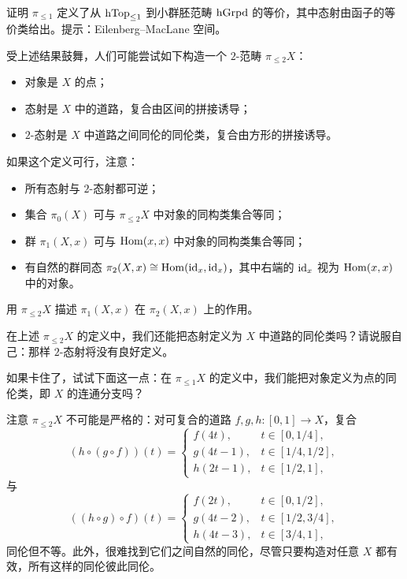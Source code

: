 \begin{exercise}\label{L1-4.12}
证明 $\pi_{\le 1}$ 定义了从 $\operatorname{hTop}_{\le 1}$ 到小群胚范畴 $\operatorname{hGrpd}$ 的等价，其中态射由函子的等价类给出。提示：Eilenberg--MacLane 空间。
\end{exercise}

\nitem\label{L1-4.13} 受上述结果鼓舞，人们可能尝试如下构造一个 $2$-范畴 $\pi_{\le 2}X$：
\begin{itemize}[leftmargin=2.2em,itemsep=0.1em]
\item 对象是 $X$ 的点；
\item 态射是 $X$ 中的道路，复合由区间的拼接诱导；
\item $2$-态射是 $X$ 中道路之间同伦的同伦类，复合由方形的拼接诱导。
\end{itemize}
如果这个定义可行，注意：
\begin{itemize}[leftmargin=2.2em,itemsep=0.1em]
\item 所有态射与 $2$-态射都可逆；
\item 集合 $\pi_0(X)$ 可与 $\pi_{\le 2}X$ 中对象的同构类集合等同；
\item 群 $\pi_1(X,x)$ 可与 $\operatorname{Hom}(x,x)$ 中对象的同构类集合等同；
\item 有自然的群同态 $\pi_2(X,x)\cong\operatorname{Hom}(\operatorname{id}_x,\operatorname{id}_x)$，其中右端的 $\operatorname{id}_x$ 视为 $\operatorname{Hom}(x,x)$ 中的对象。
\end{itemize}

\begin{exercise}\label{L1-4.14}
用 $\pi_{\le 2}X$ 描述 $\pi_1(X,x)$ 在 $\pi_2(X,x)$ 上的作用。
\end{exercise}

\begin{exercise}\label{L1-4.15}
在上述 $\pi_{\le 2}X$ 的定义中，我们还能把态射定义为 $X$ 中道路的同伦类吗？请说服自己：那样 $2$-态射将没有良好定义。

如果卡住了，试试下面这一点：在 $\pi_{\le 1}X$ 的定义中，我们能把对象定义为点的同伦类，即 $X$ 的连通分支吗？
\end{exercise}

\nitem\label{L1-4.16} 注意 $\pi_{\le 2}X$ 不可能是严格的：对可复合的道路 $f,g,h\colon[0,1]\to X$，复合
\begin{equation}\label{L1-4.1eq}
(h\circ(g\circ f))(t)=
\begin{cases}
f(4t), & t\in[0,1/4],\\
g(4t-1), & t\in[1/4,1/2],\\
h(2t-1), & t\in[1/2,1],
\end{cases}
\end{equation}
与
\begin{equation}\label{L1-4.2eq}
((h\circ g)\circ f)(t)=
\begin{cases}
f(2t), & t\in[0,1/2],\\
g(4t-2), & t\in[1/2,3/4],\\
h(4t-3), & t\in[3/4,1],
\end{cases}
\end{equation}
同伦但不等。此外，很难找到它们之间自然的同伦，尽管只要构造对任意 $X$ 都有效，所有这样的同伦彼此同伦。

